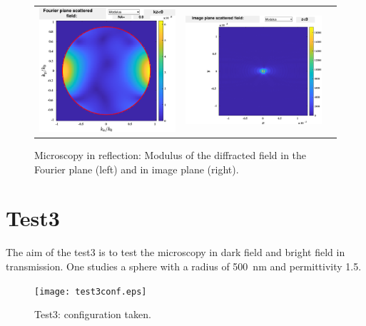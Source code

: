 \begin{figure}[H]
\begin{center}
\begin{tabular}{ccc}
  \includegraphics*[width=7.0cm,draft=false]{test2fourier.eps}
& \includegraphics*[width=7.0cm,draft=false]{test2image.eps}
\end{tabular}

\end{center}
\caption{Microscopy in reflection: Modulus of the diffracted field in
  the Fourier plane (left) and in image plane (right).}
\end{figure}




\section{Test3}

The aim of the test3 is to test the microscopy in dark field and
bright field in transmission. One studies a sphere with a radius of
500~nm and permittivity 1.5. 



\begin{figure}[H]
\begin{center}
  \texttt{[image: test3conf.eps]}
\end{center}
\caption{Test3: configuration taken.}
\label{test3conf}
\end{figure}


